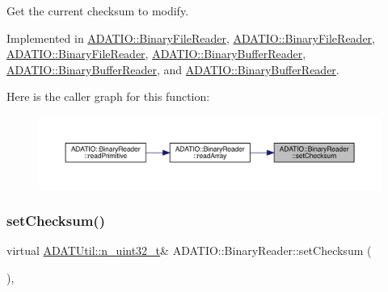 Get the current checksum to modify. 



Implemented in \mbox{\hyperlink{classADATIO_1_1BinaryFileReader_a9279d31577b7fffa174df067c72ebcc4}{A\+D\+A\+T\+I\+O\+::\+Binary\+File\+Reader}}, \mbox{\hyperlink{classADATIO_1_1BinaryFileReader_a9279d31577b7fffa174df067c72ebcc4}{A\+D\+A\+T\+I\+O\+::\+Binary\+File\+Reader}}, \mbox{\hyperlink{classADATIO_1_1BinaryFileReader_a9279d31577b7fffa174df067c72ebcc4}{A\+D\+A\+T\+I\+O\+::\+Binary\+File\+Reader}}, \mbox{\hyperlink{classADATIO_1_1BinaryBufferReader_a3976e5ece3392d04158307f864a84bb7}{A\+D\+A\+T\+I\+O\+::\+Binary\+Buffer\+Reader}}, \mbox{\hyperlink{classADATIO_1_1BinaryBufferReader_a3976e5ece3392d04158307f864a84bb7}{A\+D\+A\+T\+I\+O\+::\+Binary\+Buffer\+Reader}}, and \mbox{\hyperlink{classADATIO_1_1BinaryBufferReader_a3976e5ece3392d04158307f864a84bb7}{A\+D\+A\+T\+I\+O\+::\+Binary\+Buffer\+Reader}}.

Here is the caller graph for this function\+:
\nopagebreak
\begin{figure}[H]
\begin{center}
\leavevmode
\includegraphics[width=350pt]{da/dd9/classADATIO_1_1BinaryReader_a33d291f073bf2e1f71f6bdbe40ce343a_icgraph}
\end{center}
\end{figure}
\mbox{\label{classADATIO_1_1BinaryReader_a33d291f073bf2e1f71f6bdbe40ce343a}} 
\subsubsection{\texorpdfstring{setChecksum()}{setChecksum()}\hspace{0.1cm}{\footnotesize\ttfamily [2/3]}}
{\footnotesize\ttfamily virtual \mbox{\hyperlink{namespaceADATUtil_ad945a8afa4db2d1f89b731964adae97e}{A\+D\+A\+T\+Util\+::n\+\_\+uint32\+\_\+t}}\& A\+D\+A\+T\+I\+O\+::\+Binary\+Reader\+::set\+Checksum (\begin{DoxyParamCaption}{ }\end{DoxyParamCaption})\hspace{0.3cm}{\ttfamily [protected]}, {}}



